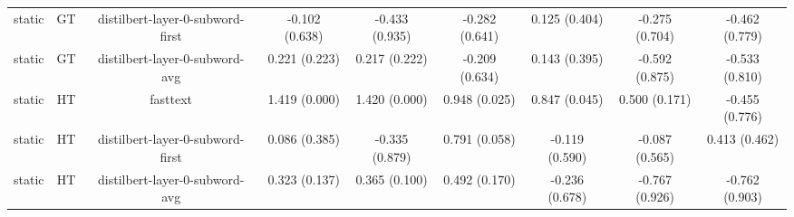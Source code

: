 \begin{sidewaystable}[htb]
\begin{tabular}{@{}ccccccccc@{}}
        static & GT & distilbert-layer-0-subword-first & -0.102 (0.638) & -0.433 (0.935) & -0.282 (0.641) & 0.125 (0.404) & -0.275 (0.704) & -0.462 (0.779) \\
        static & GT & distilbert-layer-0-subword-avg & 0.221 (0.223) & 0.217 (0.222) & -0.209 (0.634) & 0.143 (0.395) & -0.592 (0.875) & -0.533 (0.810) \\
        static & HT & fasttext & 1.419 (0.000) & 1.420 (0.000) & 0.948 (0.025) & 0.847 (0.045) & 0.500 (0.171) & -0.455 (0.776) \\
        static & HT & distilbert-layer-0-subword-first & 0.086 (0.385) & -0.335 (0.879) & 0.791 (0.058) & -0.119 (0.590) & -0.087 (0.565) & 0.413 (0.462) \\
        static & HT & distilbert-layer-0-subword-avg & 0.323 (0.137) & 0.365 (0.100) & 0.492 (0.170) & -0.236 (0.678) & -0.767 (0.926) & -0.762 (0.903) \\
        \bottomrule
    \end{tabular}
\end{sidewaystable}